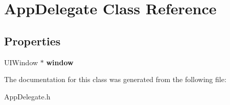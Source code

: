 \hypertarget{interface_app_delegate}{\section{\-App\-Delegate \-Class \-Reference}
\label{interface_app_delegate}
}
\subsection*{\-Properties}
\begin{DoxyCompactItemize}
\item 
\hypertarget{interface_app_delegate_acf48ac24125e688cac1a85445cd7fac2}{\-U\-I\-Window $\ast$ {\bfseries window}}\label{interface_app_delegate_acf48ac24125e688cac1a85445cd7fac2}

\end{DoxyCompactItemize}


\-The documentation for this class was generated from the following file\-:\begin{DoxyCompactItemize}
\item 
\-App\-Delegate.\-h\end{DoxyCompactItemize}
